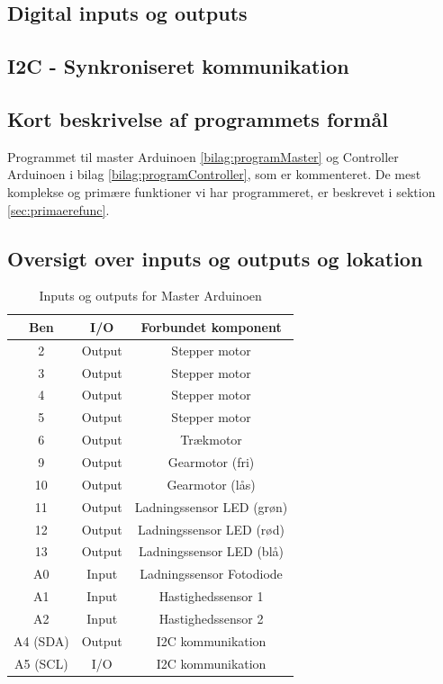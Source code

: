 \subsection{Digital inputs og outputs}
\subsection{I2C - Synkroniseret kommunikation}


\subsection{Kort beskrivelse af programmets formål}

Programmet til master Arduinoen \ref{bilag:programMaster} og Controller Arduinoen i bilag \ref{bilag:programController}, som er kommenteret. De mest komplekse og primære funktioner vi har programmeret, er beskrevet i sektion \ref{sec:primaerefunc}.
\subsection{Oversigt over inputs og outputs og lokation}
\begin{table}[H]
	\caption{Inputs og outputs for Master Arduinoen} %
	\label{tab:IOMaster}
	\centering
		\begin{tabular}{c|c c} 
		Ben & I/O & Forbundet komponent\\ [0.5ex] 
		\hline 
			2 & Output & Stepper motor\\
			3 & Output & Stepper motor\\
			4 & Output & Stepper motor\\
			5 & Output & Stepper motor\\
			6 & Output & Trækmotor\\
			9 & Output & Gearmotor (fri)\\
			10 & Output & Gearmotor (lås)\\
			11 & Output & Ladningssensor LED (grøn)\\
			12 & Output & Ladningssensor LED (rød)\\
			13 & Output & Ladningssensor LED (blå)\\
			A0 & Input & Ladningssensor Fotodiode\\
			A1 & Input & Hastighedssensor 1\\			
			A2 & Input & Hastighedssensor 2\\
			A4 (SDA) & Output & I2C kommunikation\\
			A5 (SCL) & I/O & I2C kommunikation\\[1ex]
		\hline %
	\end{tabular}
\end{table}

